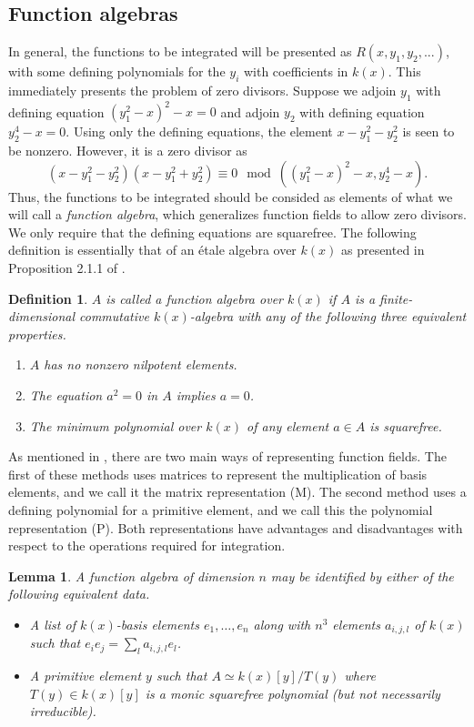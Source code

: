 \documentclass[12pt,reqno]{amsart}
\numberwithin{equation}{section}
\newtheorem{definition}[theorem]{Definition}
\newtheorem{lemma}[theorem]{Lemma}
\begin{document}
\subsection{Function algebras}
\label{subsection_fa}
In general, the functions to be integrated will be presented as $R(x,y_1,y_2,...)$, with some defining polynomials for the $y_i$ with coefficients in $k(x)$. This immediately presents the problem of zero divisors. Suppose we adjoin $y_1$ with defining equation $(y_1^2-x)^2-x=0$ and adjoin $y_2$ with defining equation $y_2^4-x=0$. Using only the defining equations, the element $x-y_1^2-y_2^2$ is seen to be nonzero. However, it is a zero divisor as
\begin{equation*}
 (x-y_1^2-y_2^2)(x-y_1^2+y_2^2) \equiv 0 \mod ((y_1^2-x)^2-x,y_2^4-x)\text{.}
\end{equation*}
Thus, the functions to be integrated should be consided as elements of what we will call a \emph{function algebra}, which generalizes function fields to allow zero divisors. We only require that the defining equations are squarefree. The following definition is essentially that of an \'etale algebra over $k(x)$ as presented in Proposition 2.1.1 of \cite{adv2}.
\begin{definition}
 $A$ is called a function algebra over $k(x)$ if $A$ is a finite-dimensional commutative $k(x)$-algebra with any of the following three equivalent properties.
\begin{enumerate}
 \item $A$ has no nonzero nilpotent elements.
 \item The equation $a^2=0$ in $A$ implies $a=0$.
 \item The minimum polynomial over $k(x)$ of any element $a\in A$ is squarefree.
\end{enumerate}
\end{definition}

As mentioned in \cite[pg. 50]{adv2}, there are two main ways of representing function fields. The first of these methods uses matrices to represent the multiplication of basis elements, and we call it the matrix representation (M). The second method uses a defining polynomial for a primitive element, and we call this the polynomial representation (P). Both representations have advantages and disadvantages with respect to the operations required for integration.

\begin{lemma}
 A function algebra of dimension $n$ may be identified by either of the following equivalent data.
\begin{itemize}
\item[(M)] A list of $k(x)$-basis elements $e_1,\dots,e_n$ along with $n^3$ elements $a_{i,j,l}$ of $k(x)$ such that $e_i e_j = \sum_{l} a_{i,j,l} e_l$.
\item[(P)] A primitive element $y$ such that $A \simeq k(x)[y]/T(y)$ where $T(y) \in k(x)[y]$ is a monic squarefree polynomial (but not necessarily irreducible).
\end{itemize}
\end{lemma}
\end{document}
